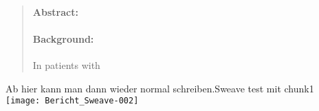 





\usepackage{Sweave}






\begin{abstract}
  \noindent
	\paragraph{Abstract:}
	\paragraph{Background:} In patients with
\end{abstract}

\newpage
\tableofcontents

\newpage
{} %


Ab hier kann man dann wieder normal schreiben.Sweave test mit chunk1\\


\texttt{[image: Bericht\_Sweave-002]}



\newpage
\printbibliography 


